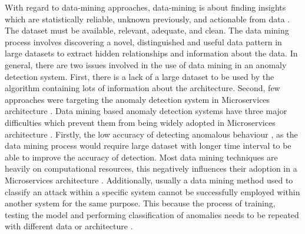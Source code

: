 \documentclass[sigconf]{acmart}
\begin{document}
With regard to data-mining approaches, data-mining is about finding insights which are statistically reliable, unknown previously, and actionable from data \cite{phua2010comprehensive}. The dataset must be available, relevant, adequate, and clean. The data mining process involves discovering a novel, distinguished and useful data pattern in large datasets to extract hidden relationships and information about the data. In general, there are two issues involved in the use of data mining in an anomaly detection system. First, there is a lack of a large dataset to be used by the algorithm containing lots of information about the architecture. Second, few approaches were targeting the anomaly detection system in Microservices architecture \cite{phua2010comprehensive}. Data mining based anomaly detection systems have three major difficulties which prevent them from being widely adopted in Microservices architecture \cite{Patcha:2007hja}. Firstly, the low accuracy of detecting anomalous behaviour \cite{gupta2016network,Patcha:2007hja}, as the data mining process would require large dataset with longer time interval to be able to improve the accuracy of detection. Most data mining techniques are heavily on computational resources, this negatively influences their adoption in a Microservices architecture \cite{Patcha:2007hja}. Additionally, usually a data mining method used to classify an attack within a specific system cannot be successfully employed within another system for the same purpose. This because the process of training, testing the model and performing classification of anomalies needs to be repeated with different data or architecture \cite{Buczak:2016kt}.  
\end{document}
